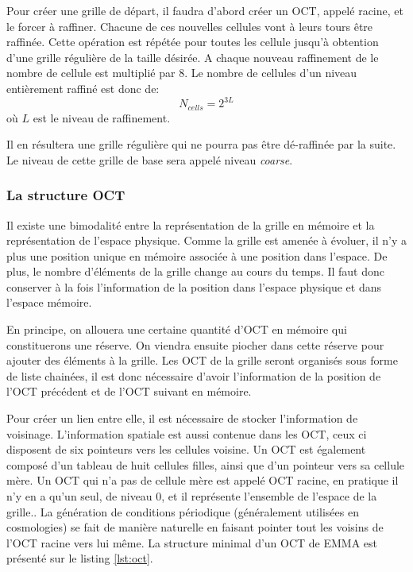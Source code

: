 Pour créer une grille de départ, il faudra d'abord créer un OCT, appelé racine, et le forcer à raffiner.
Chacune de ces nouvelles cellules vont à leurs tours être raffinée.
Cette opération est répétée pour toutes les cellule jusqu'à obtention d'une grille régulière de la taille désirée.
A chaque nouveau raffinement de le nombre de cellule est multiplié par 8.
Le nombre de cellules d'un niveau entièrement raffiné est donc de:
\begin{equation}
N_{cells} = 2^{3L}
\end{equation}
où $L$ est le niveau de raffinement.

Il en résultera une grille régulière qui ne pourra pas être dé-raffinée par la suite.
Le niveau de cette grille de base sera appelé niveau \textit{coarse}.

\subsubsection{La structure OCT}

Il existe une bimodalité entre la représentation de la grille en mémoire et la représentation de l'espace physique.
Comme la grille est amenée à évoluer, il n'y a plus une position unique en mémoire associée à une position dans l'espace.
De plus, le nombre d'éléments de la grille change au cours du temps.
Il faut donc conserver à la fois l'information de la position dans l'espace physique et dans l'espace mémoire.

En principe, on allouera une certaine quantité d'OCT en mémoire qui constituerons une réserve.
On viendra ensuite piocher dans cette réserve pour ajouter des éléments à la grille.
Les OCT de la grille seront organisés sous forme de liste chainées, il est donc nécessaire d'avoir l'information de la position de l'OCT précédent et de l'OCT suivant en mémoire.

Pour créer un lien entre elle, il est nécessaire de stocker l'information de voisinage.
L'information spatiale est aussi contenue dans les OCT, ceux ci disposent de six pointeurs vers les cellules voisine.
Un OCT est également composé d'un tableau de huit cellules filles, ainsi que d'un pointeur vers sa cellule mère.
Un OCT qui n'a pas de cellule mère est appelé OCT racine, en pratique il n'y en a qu'un seul, de niveau 0, et il représente l'ensemble de l'espace de la grille..
La génération de conditions périodique (généralement utilisées en cosmologies) se fait de manière naturelle en faisant pointer tout les voisins de l'OCT racine vers lui même.
La structure minimal d'un OCT de EMMA est présenté sur le listing \ref{lst:oct}.

